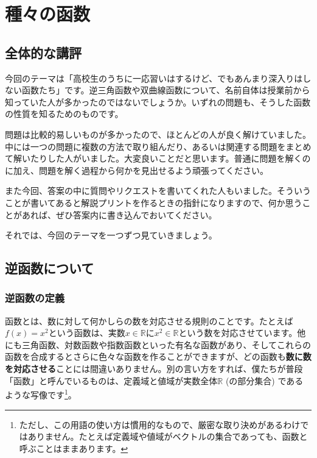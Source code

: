 \chapter{種々の函数}


\section{全体的な講評}

今回のテーマは「高校生のうちに一応習いはするけど、でもあんまり深入りはしない函数たち」です。逆三角函数や双曲線函数について、名前自体は授業前から知っていた人が多かったのではないでしょうか。いずれの問題も、そうした函数の性質を知るためのものです。

問題は比較的易しいものが多かったので、ほとんどの人が良く解けていました。中には一つの問題に複数の方法で取り組んだり、あるいは関連する問題をまとめて解いたりした人がいました。大変良いことだと思います。普通に問題を解くのに加え、問題を解く過程から何かを見出せるよう頑張ってください。

また今回、答案の中に質問やリクエストを書いてくれた人もいました。そういうことが書いてあると解説プリントを作るときの指針になりますので、何か思うことがあれば、ぜひ答案内に書き込んでおいてください。

それでは、今回のテーマを一つずつ見ていきましょう。

\section{逆函数について}

\subsection{逆函数の定義}

函数とは、数に対して何かしらの数を対応させる規則のことです。たとえば$f(x)=x^2$という函数は、実数$x\in\mathbb{R}$に$x^2\in\mathbb{R}$という数を対応させています。他にも三角函数、対数函数や指数函数といった有名な函数があり、そしてこれらの函数を合成するとさらに色々な函数を作ることができますが、どの函数も\textbf{数に数を対応させる}ことには間違いありません。別の言い方をすれば、僕たちが普段「函数」と呼んでいるものは、定義域と値域が実数全体$\mathbb{R}$ (の部分集合) であるような写像です\footnote{ただし、この用語の使い方は慣用的なもので、厳密な取り決めがあるわけではありません。たとえば定義域や値域がベクトルの集合であっても、函数と呼ぶことはままあります。}。

